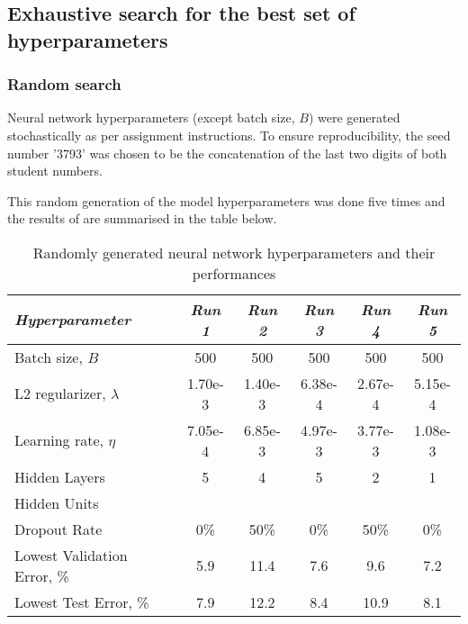 \documentclass[a4paper,12pt]{article}
\begin{document}
\clearpage
\subsection{Exhaustive search for the best set of hyperparameters}
\subsubsection{Random search}

Neural network hyperparameters (except batch size, $B$) were generated stochastically as per assignment instructions. To ensure reproducibility, the seed number '3793' was chosen to be the concatenation of the last two digits of both student numbers. 

This random generation of the model hyperparameters was done five times and the results of are summarised in the table below.

\begin{table}[!htb]
\centering
\caption{Randomly generated neural network hyperparameters and their performances}
\label{table:NN_RandomGeneration}
\vspace{0.5em}
\begin{tabular}{|l|c c c c c|} \hline
\textit{Hyperparameter} & \textit{Run 1} & \textit{Run 2} & \textit{Run 3} & \textit{Run 4} & \textit{Run 5} \\ \hline
Batch size, $B$ & 500 & 500 & 500 & 500 & 500 \\
L2 regularizer, $\lambda$ & 1.70e-3 & 1.40e-3 & 6.38e-4 & 2.67e-4 & 5.15e-4  \\
Learning rate, $\eta$ & 7.05e-4 & 6.85e-3 & 4.97e-3 & 3.77e-3 & 1.08e-3 \\
Hidden Layers & 5 & 4 & 5 & 2 & 1 \\
Hidden Units & \footnotemark & \footnotemark & \footnotemark & \footnotemark & \footnotemark \\
Dropout Rate & 0\% & 50\% & 0\% & 50\% & 0\% \\
\hline
\small{Lowest Validation Error, \%} & 5.9 & 11.4 & 7.6 & 9.6 & 7.2  \\
Lowest Test Error, \% & 7.9 & 12.2 & 8.4 & 10.9 & 8.1 \\
\hline
\end{tabular}
\end{table}
\end{document}
